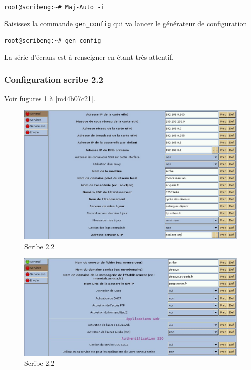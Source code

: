 \documentclass{article}
\makeatletter
\def\maxwidth{\ifdim\Gin@nat@width>\linewidth\linewidth
\else\Gin@nat@width\fi}
\let\Oldincludegraphics\includegraphics
\renewcommand{\includegraphics}[1]{\Oldincludegraphics[width=\maxwidth]{#1}}
\makeatother
\begin{document}
\lstinline!root@scribeng:~# Maj-Auto -i!

Saisissez la commande \lstinline!gen_config! qui va lancer le générateur
de configuration

\lstinline!root@scribeng:~# gen_config!

La série d'écrans est à renseigner en étant très attentif.

\subsubsection{Configuration scribe 2.2}

Voir fugures \ref{m4d52829f} à \ref{m44b07c21}.

\begin{figure}[htbp]
\centering
\includegraphics{scribe_html_m4d52829f.jpg}
\caption{Scribe 2.2 \label{m4d52829f}}
\end{figure}

\begin{figure}[htbp]
\centering
\includegraphics{scribe_html_1f004f88.jpg}
\caption{Scribe 2.2}
\end{figure}
\end{document}
